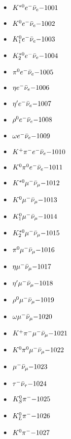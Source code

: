 
 \begin{multicols}{3} 
 \begin{itemize}
 \item $ K^{*0} e^{-} \bar{\nu}_{e} \hfill{-1001}$
 \item $ K^{0} e^{-} \bar{\nu}_{e} \hfill{-1002}$
 \item $ K_{1}^{0} e^{-} \bar{\nu}_{e} \hfill{-1003}$
 \item $ K_{2}^{*0} e^{-} \bar{\nu}_{e} \hfill{-1004}$
 \item $ \pi^{0} e^{-} \bar{\nu}_{e} \hfill{-1005}$
 \item $ \eta e^{-} \bar{\nu}_{e} \hfill{-1006}$
 \item $ {\eta^{\prime}} e^{-} \bar{\nu}_{e} \hfill{-1007}$
 \item $ \rho^{0} e^{-} \bar{\nu}_{e} \hfill{-1008}$
 \item $ \omega e^{-} \bar{\nu}_{e} \hfill{-1009}$
 \item $ K^{+} \pi^{-} e^{-} \bar{\nu}_{e} \hfill{-1010}$
 \item $ K^{0} \pi^{0} e^{-} \bar{\nu}_{e} \hfill{-1011}$
 \item $ K^{*0} \mu^{-} \bar{\nu}_{\mu} \hfill{-1012}$
 \item $ K^{0} \mu^{-} \bar{\nu}_{\mu} \hfill{-1013}$
 \item $ K_{1}^{0} \mu^{-} \bar{\nu}_{\mu} \hfill{-1014}$
 \item $ K_{2}^{*0} \mu^{-} \bar{\nu}_{\mu} \hfill{-1015}$
 \item $ \pi^{0} \mu^{-} \bar{\nu}_{\mu} \hfill{-1016}$
 \item $ \eta \mu^{-} \bar{\nu}_{\mu} \hfill{-1017}$
 \item $ {\eta^{\prime}} \mu^{-} \bar{\nu}_{\mu} \hfill{-1018}$
 \item $ \rho^{0} \mu^{-} \bar{\nu}_{\mu} \hfill{-1019}$
 \item $ \omega \mu^{-} \bar{\nu}_{\mu} \hfill{-1020}$
 \item $ K^{+} \pi^{-} \mu^{-} \bar{\nu}_{\mu} \hfill{-1021}$
 \item $ K^{0} \pi^{0} \mu^{-} \bar{\nu}_{\mu} \hfill{-1022}$
 \item $ \mu^{-} \bar{\nu}_{\mu} \hfill{-1023}$
 \item $ \tau^{-} \bar{\nu}_{\tau} \hfill{-1024}$
 \item $ K_{S}^{0} \pi^{-} \hfill{-1025}$
 \item $ K_{L}^{0} \pi^{-} \hfill{-1026}$
 \item $ K^{0} \pi^{-} \hfill{-1027}$

\end{itemize}
\end{multicols}
